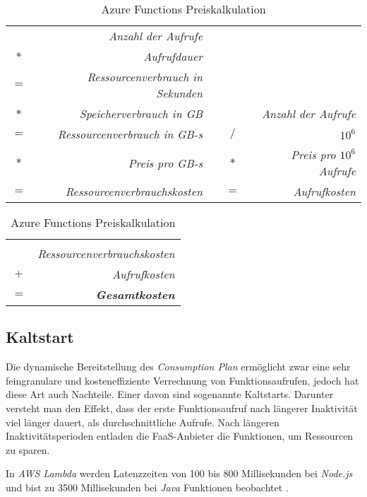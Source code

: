 \begin{table}[!hbt]
\caption{Azure Functions Preiskalkulation}
\label{tab:azfun-pricing}
\centering

\begin{tabular}{crccr}
& \textit{Anzahl der Aufrufe} & & & \\
$*$ & \textit{Aufrufdauer} & & & \\
\cline{1-2}
$=$ & \textit{Ressourcenverbrauch in Sekunden} & & & \\
$*$ & \textit{Speicherverbrauch in GB} & & & \textit{Anzahl der Aufrufe} \\
\cline{1-2}
$=$ & \textit{Ressourcenverbrauch in GB-s} & & $/$ & $10^6$ \\
$*$ & \textit{Preis pro GB-s} & & $*$ & \textit{Preis pro $10^6$ Aufrufe} \\
\cline{1-2}\cline{4-5}
$=$ & \textit{Ressourcenverbrauchskosten} & & $=$ & \textit{Aufrufkosten} \\
\end{tabular}

\begin{tabular}{cr}
 & \\
& \textit{Ressourcenverbrauchskosten} \\
$+$ & \textit{Aufrufkosten} \\
\hline
$=$ & \textit{\textbf{Gesamtkosten}} \\
\hline\hline
\end{tabular}

\end{table}

\subsection{Kaltstart}

Die dynamische Bereitstellung des \textit{Consumption Plan} ermöglicht zwar eine sehr feingranulare und kosteneffiziente Verrechnung von Funktionsaufrufen, jedoch hat diese Art auch Nachteile. Einer davon sind sogenannte Kaltstarts. Darunter versteht man den Effekt, dass der erste Funktionsaufruf nach längerer Inaktivität viel länger dauert, als durchschnittliche Aufrufe. Nach längeren Inaktivitätsperioden entladen die FaaS-Anbieter die Funktionen, um Ressourcen zu sparen.

In \textit{AWS Lambda} werden Latenzzeiten von 100 bis 800 Millisekunden bei \textit{Node.js} und bist zu 3500 Millisekunden bei \textit{Java} Funktionen beobachtet \cite[Kap. 16]{Fuller2016}.


